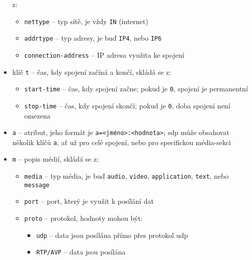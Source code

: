 \begin{itemize}
          z:
          \begin{itemize}
              \item \texttt{nettype} -- typ sítě, je vždy
                    \texttt{IN} (internet)
              \item \texttt{addrtype} -- typ adresy, je buď
                    \texttt{IP4}, nebo \texttt{IP6}
              \item \texttt{connection-address} -- IP adresa využita
                    ke spojení
          \end{itemize}
    \item klíč \texttt{t} -- čas, kdy spojení začíná a končí, skládá
          se z:
          \begin{itemize}
              \item \texttt{start-time} -- čas, kdy spojení začne;
                    pokud je \texttt{0}, spojení je permanentní
              \item \texttt{stop-time} -- čas, kdy spojení skončí;
                    pokud je \texttt{0}, doba spojení není omezena
          \end{itemize}
    \item \texttt{a} -- atribut, jeho formát je
          \texttt{a=<jméno>:<hodnota>}; \gls{sdp} může obsahovat
          několik klíčů \texttt{a}, ať už pro celé spojení, nebo pro
          specifickou média-sekci
    \item \texttt{m} -- popis médií, skládá se z:
          \begin{itemize}
              \item \texttt{media} -- typ média, je buď
                    \texttt{audio}, \texttt{video},
                    \texttt{application}, \texttt{text},
                    nebo \texttt{message}
              \item \texttt{port} -- port, který je využit k posílání
                    dat
              \item \texttt{proto} -- protokol, hodnoty mohou být:
                    \begin{itemize}
                        \item \texttt{udp} -- data jsou posílána přímo
                              přes protokol \gls{udp}
                        \item \texttt{RTP/AVP} -- data jsou posílána

\end{itemize}
\end{itemize}
\end{itemize}
